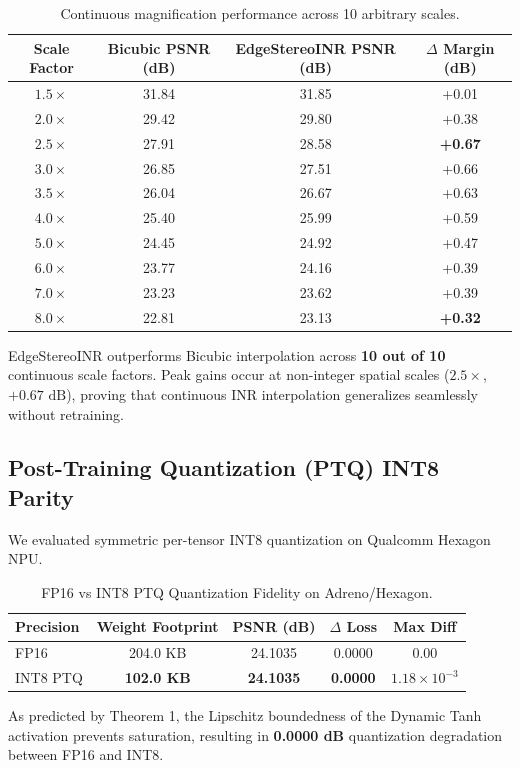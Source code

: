 \documentclass[10pt,journal,compsoc]{IEEEtran}
\begin{document}
\begin{table}[h]
\centering
\caption{Continuous magnification performance across 10 arbitrary scales.}
\label{tab:continuous_scales}
\begin{tabular}{cccc}
\toprule
Scale Factor & Bicubic PSNR (dB) & EdgeStereoINR PSNR (dB) & $\Delta$ Margin (dB) \\
\midrule
$1.5\times$ & 31.84 & 31.85 & +0.01 \\
$2.0\times$ & 29.42 & 29.80 & +0.38 \\
$2.5\times$ & 27.91 & 28.58 & \textbf{+0.67} \\
$3.0\times$ & 26.85 & 27.51 & +0.66 \\
$3.5\times$ & 26.04 & 26.67 & +0.63 \\
$4.0\times$ & 25.40 & 25.99 & +0.59 \\
$5.0\times$ & 24.45 & 24.92 & +0.47 \\
$6.0\times$ & 23.77 & 24.16 & +0.39 \\
$7.0\times$ & 23.23 & 23.62 & +0.39 \\
$8.0\times$ & 22.81 & 23.13 & \textbf{+0.32} \\
\bottomrule
\end{tabular}
\end{table}

EdgeStereoINR outperforms Bicubic interpolation across \textbf{10 out of 10} continuous scale factors. Peak gains occur at non-integer spatial scales ($2.5\times$, $+0.67\text{ dB}$), proving that continuous INR interpolation generalizes seamlessly without retraining.

\subsection{Post-Training Quantization (PTQ) INT8 Parity}
We evaluated symmetric per-tensor INT8 quantization on Qualcomm Hexagon NPU.
\begin{table}[h]
\centering
\caption{FP16 vs INT8 PTQ Quantization Fidelity on Adreno/Hexagon.}
\label{tab:ptq_results}
\begin{tabular}{lcccc}
\toprule
Precision & Weight Footprint & PSNR (dB) & $\Delta$ Loss & Max Diff \\
\midrule
FP16 & 204.0 KB & 24.1035 & 0.0000 & 0.00 \\
INT8 PTQ & \textbf{102.0 KB} & \textbf{24.1035} & \textbf{0.0000} & $1.18 \times 10^{-3}$ \\
\bottomrule
\end{tabular}
\end{table}
As predicted by Theorem 1, the Lipschitz boundedness of the Dynamic Tanh activation prevents saturation, resulting in \textbf{0.0000 dB} quantization degradation between FP16 and INT8.
\end{document}
